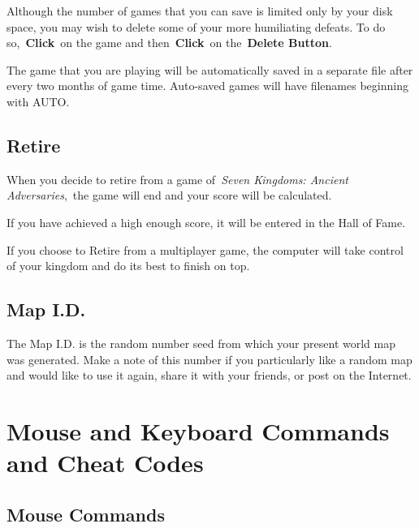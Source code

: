 Although the number of games that you can save is limited only by your disk space, you may wish to delete some of your more humiliating defeats. To do so, \textbf{Click} on the game and then \textbf{Click} on the \textbf{Delete Button}.

The game that you are playing will be automatically saved in a separate file after every two months of game time. Auto-saved games will have filenames beginning with AUTO.

\subsection{Retire}

When you decide to retire from a game of \textit{Seven Kingdoms: Ancient Adversaries}, the game will end and your score will be calculated.

If you have achieved a high enough score, it will be entered in the Hall of Fame.

If you choose to Retire from a multiplayer game, the computer will take control of your kingdom and do its best to finish on top.

\subsection{Map I.D.}

The Map I.D. is the random number seed from which your present world map was generated. Make a note of this number if you particularly like a random map and would like to use it again, share it with your friends, or post on the Internet.

\section{Mouse and Keyboard Commands and Cheat Codes}


\subsection{Mouse Commands}

